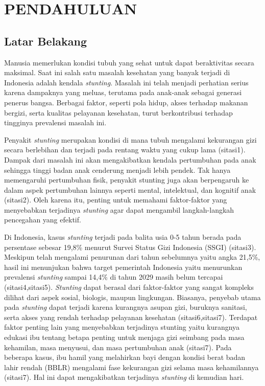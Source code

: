 \newpage
\pagestyle{fancy}
\fancyhf{}
\fancyhead[R]{\thepage}
\chapter{PENDAHULUAN} \label{Bab I}

\section{Latar Belakang} \label{I.Latar Belakang}
Manusia memerlukan kondisi tubuh yang sehat untuk dapat beraktivitas secara maksimal. Saat ini salah satu masalah kesehatan yang banyak terjadi di Indonesia adalah kendala \textit{stunting}. Masalah ini telah menjadi perhatian serius karena dampaknya yang meluas, terutama pada anak-anak sebagai generasi penerus bangsa. Berbagai faktor, seperti pola hidup, akses terhadap makanan bergizi, serta kualitas pelayanan kesehatan, turut berkontribusi terhadap tingginya prevalensi masalah ini.

Penyakit \textit{stunting} merupakan kondisi di mana tubuh mengalami kekurangan gizi secara berlebihan dan terjadi pada rentang waktu yang cukup lama (sitasi1). Dampak dari masalah ini akan mengakibatkan kendala pertumbuhan pada anak sehingga tinggi badan anak cenderung menjadi lebih pendek. Tak hanya memengaruhi pertumbuhan fisik, penyakit stunting juga akan berpengaruh ke dalam aspek pertumbuhan lainnya seperti mental, intelektual, dan kognitif anak (sitasi2). Oleh karena itu, penting untuk memahami faktor-faktor yang menyebabkan terjadinya \textit{stunting} agar dapat mengambil langkah-langkah pencegahan yang efektif.

Di Indonesia, kasus \textit{stunting} terjadi pada balita usia 0-5 tahun berada pada persentase sebesar 19,8\% menurut Survei Status Gizi Indonesia (SSGI) (sitasi3). Meskipun telah mengalami penurunan dari tahun sebelumnya yaitu angka 21,5\%, hasil ini menunjukan bahwa target pemerintah Indonesia yaitu menurunkan prevalensi \textit{stunting} sampai 14,4\% di tahun 2029 masih belum tercapai (sitasi4,sitasi5). \textit{Stunting} dapat berasal dari faktor-faktor yang sangat kompleks dilihat dari aspek sosial, biologis, maupun lingkungan. Biasanya, penyebab utama pada \textit{stunting} dapat terjadi karena kurangnya asupan gizi, buruknya sanitasi, serta akses yang rendah terhadap pelayanan kesehatan (sitasi6,sitasi7). Terdapat faktor penting lain yang menyebabkan terjadinya stunting yaitu kurangnya edukasi ibu tentang betapa penting untuk menjaga gizi seimbang pada masa kehamilan, masa menyusui, dan masa pertumbuhan anak (sitasi7). Pada beberapa kasus, ibu hamil yang melahirkan bayi dengan kondisi berat badan lahir rendah (BBLR) mengalami fase kekurangan gizi selama masa kehamilannya (sitasi7). Hal ini dapat mengakibatkan terjadinya \textit{stunting} di kemudian hari. 

